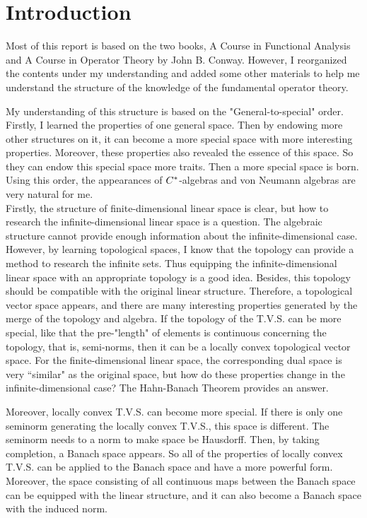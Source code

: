 \chapter{Introduction}

Most of this report is based on the two books, A Course in Functional Analysis and A Course in Operator Theory by John B. Conway. However, I reorganized the contents under my understanding and added some other materials to help me understand the structure of the knowledge of the fundamental operator theory.

My understanding of this structure is based on the "General-to-special" order. Firstly, I learned the properties of one general space. Then by endowing more other structures on it, it can become a more special space with more interesting properties. Moreover, these properties also revealed the essence of this space. So they can endow this special space more traits. Then a more special space is born. Using this order, the appearances of $C^{*}$-algebras and von Neumann algebras are very natural for me.\\
Firstly, the structure of finite-dimensional linear space is clear, but how to research the infinite-dimensional linear space is a question. The algebraic structure cannot provide enough information about the infinite-dimensional case. However, by learning topological spaces, I know that the topology can provide a method to research the infinite sets. Thus equipping the infinite-dimensional linear space with an appropriate topology is a good idea. Besides, this topology should be compatible with the original linear structure. Therefore, a topological vector space appears, and there are many interesting properties generated by the merge of the topology and algebra. If the topology of the T.V.S. can be more special, like that the pre-"length" of elements is continuous concerning the topology, that is, semi-norms, then it can be a locally convex topological vector space. For the finite-dimensional linear space, the corresponding dual space is very ``similar" as the original space, but how do these properties change in the infinite-dimensional case? The Hahn-Banach Theorem provides an answer.

Moreover, locally convex T.V.S. can become more special. If there is only one seminorm generating the locally convex T.V.S., this space is different. The seminorm needs to a norm to make space be Hausdorff. Then, by taking completion, a Banach space appears. So all of the properties of locally convex T.V.S. can be applied to the Banach space and have a more powerful form. Moreover, the space consisting of all continuous maps between the Banach space can be equipped with the linear structure, and it can also become a Banach space with the induced norm.

